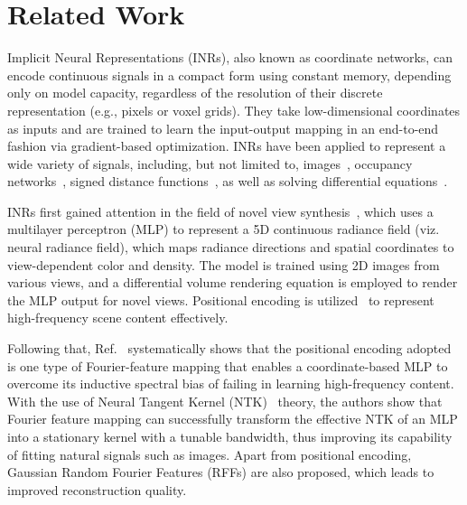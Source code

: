 \documentclass[letterpaper]{article} %
\begin{document}
\section{Related Work}
\label{sec:background}
Implicit Neural Representations (INRs), also known as coordinate networks, can encode continuous signals in a compact form using constant memory, depending only on model capacity, regardless of the resolution of their discrete representation (e.g., pixels or voxel grids). They take low-dimensional coordinates as inputs and are trained to learn the input-output mapping in an end-to-end fashion via gradient-based optimization. INRs have been applied to represent a wide variety of signals, including, but not limited to, images~\cite{saragadam2023wire,lindell2022bacon, shekarforoush2022residual}, occupancy networks~\cite{chen2019learning, mescheder2019occupancy}, signed distance functions~\cite{sitzmann2019scene, park2019deepsdf}, as well as solving differential equations~\cite{2020siren, fathony2020multiplicative}.

INRs first gained attention in the field of novel view synthesis~\cite{mildenhall2021nerf}, which uses a multilayer perceptron (MLP) to represent a 5D continuous radiance field (viz. neural radiance field), which maps radiance directions and spatial coordinates to view-dependent color and density. The model is trained using 2D images from various views, and a differential volume rendering equation is employed to render the MLP output for novel views. Positional encoding is utilized~\cite{vaswani2017attention} to represent high-frequency scene content effectively.

Following that, Ref.~\cite{tancik2020fourier} systematically shows that the positional encoding adopted is one type of Fourier-feature mapping that enables a coordinate-based MLP to overcome its inductive spectral bias of failing in learning high-frequency content. With the use of Neural Tangent Kernel (NTK)~\cite{jacot2018ntk} theory, the authors show that Fourier feature mapping can successfully transform the effective NTK of an MLP into a stationary kernel with a tunable bandwidth, thus improving its capability of fitting natural signals such as images. Apart from positional encoding, Gaussian Random Fourier Features (RFFs) are also proposed, which leads to improved reconstruction quality.
\end{document}
